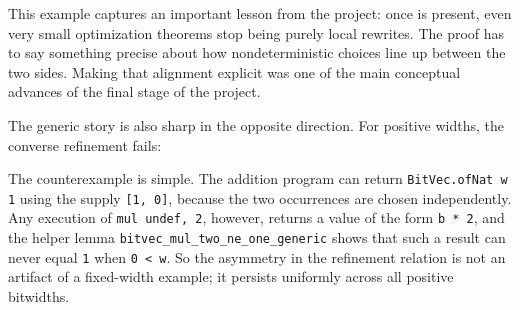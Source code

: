 This example captures an important lesson from the project: once \vundef is
present, even very small optimization theorems stop being purely local
rewrites. The proof has to say something precise about how nondeterministic
choices line up between the two sides. Making that alignment explicit was one
of the main conceptual advances of the final stage of the project.

The generic story is also sharp in the opposite direction. For positive
widths, the converse refinement fails:
\small
{}
\normalsize

The counterexample is simple. The addition program can return
\texttt{BitVec.ofNat w 1} using the supply \texttt{[1, 0]}, because the two
\vundef occurrences are chosen independently. Any execution of
\texttt{mul undef, 2}, however, returns a value of the form \texttt{b * 2}, and
the helper lemma \texttt{bitvec\_mul\_two\_ne\_one\_generic} shows that such a
result can never equal \texttt{1} when \texttt{0 < w}. So the asymmetry in the
refinement relation is not an artifact of a fixed-width example; it persists
uniformly across all positive bitwidths.
